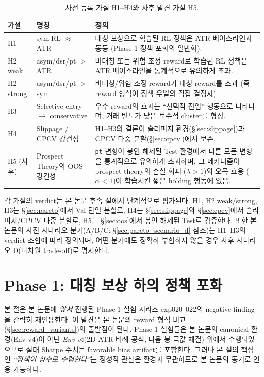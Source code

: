 \documentclass[11pt, a4paper]{article}
\begin{document}
\begin{table}[!htbp]
\centering
\small
\caption{사전 등록 가설 H1--H4와 사후 발견 가설 H5.}
\begin{tabular}{p{1.3cm}p{4cm}p{8cm}}
\toprule
가설 & 명칭 & 정의 \\
\midrule
H1 & sym RL $\approx$ ATR & 대칭 보상으로 학습된 RL 정책은 ATR 베이스라인과 동등 (Phase 1 정책 포화의 일반화). \\
H2 weak & asym/dsr/pt $>$ ATR & 비대칭 또는 위험 조정 reward로 학습된 RL 정책은 ATR 베이스라인을 통계적으로 유의하게 초과. \\
H2 strong & asym/dsr/pt $>$ sym & 비대칭/위험 조정 reward가 대칭 reward를 초과 (즉 reward 형식이 정책 우열의 직접 결정자). \\
H3 & Selective entry $\to$ conservative & 우수 reward의 효과는 ``선택적 진입'' 행동으로 나타나며, 거래 빈도가 낮은 보수적 cluster를 형성. \\
H4 & Slippage / CPCV 강건성 & H1--H3의 결론이 슬리피지 환경(\S\ref{sec:slippage})과 CPCV 다중 분할(\S\ref{sec:cpcv})에서 보존. \\
\midrule
H5 (사후) & Prospect Theory의 OOS 강건성 & \texttt{pt} 변형이 봉인 해제된 Test 환경에서 다른 모든 변형을 통계적으로 유의하게 초과하며, 그 메커니즘이 prospect theory의 손실 회피 ($\lambda > 1$)와 오목 효용 ($\alpha < 1$)이 학습시킨 짧은 holding 행동에 있음. \\
\bottomrule
\end{tabular}
\label{tab:hypotheses}
\end{table}

각 가설의 verdict는 본 논문 후속 절에서 단계적으로 평가된다. H1, H2 weak/strong,
H3는 \S\ref{sec:pareto}에서 Val 단일 분할로, H4는 \S\ref{sec:slippage}와
\S\ref{sec:cpcv}에서 슬리피지/CPCV 다중 분할로, H5는 \S\ref{sec:oos}에서 봉인 해제된
Test로 검증한다. 또한 본 논문의 사전 시나리오 분기(A/B/C: \S\ref{sec:pareto_scenario_d}
참조)는 H1--H3의 verdict 조합에 따라 정의되며, 어떤 분기에도 정확히 부합하지 않을
경우 사후 시나리오 D(다차원 trade-off)로 명시한다.

\section{Phase 1: 대칭 보상 하의 정책 포화}
\label{sec:phase1_negative}

본 절은 본 논문에 \emph{앞서} 진행된 Phase 1 실험 시리즈
exp020--022의 negative finding을 간략히 재인용한다. 이 발견은 본 논문의 reward
형식 비교(\S\ref{sec:reward_variants})의 출발점이 된다. Phase 1
실험들은 본 논문의 canonical 환경(Env-v4)이 아닌 \emph{Env-v2}(2D ATR 비례
공식, 다음 봉 극값 체결) 위에서 수행되었으므로 절대 Sharpe 수치는 favorable
bias artifact를 포함한다. 그러나 본 절의 핵심인 \emph{``정책이 상수로
수렴한다''}는 정성적 관찰은 환경과 무관하므로 본 논문의 동기로 인용 가능하다.
\end{document}
